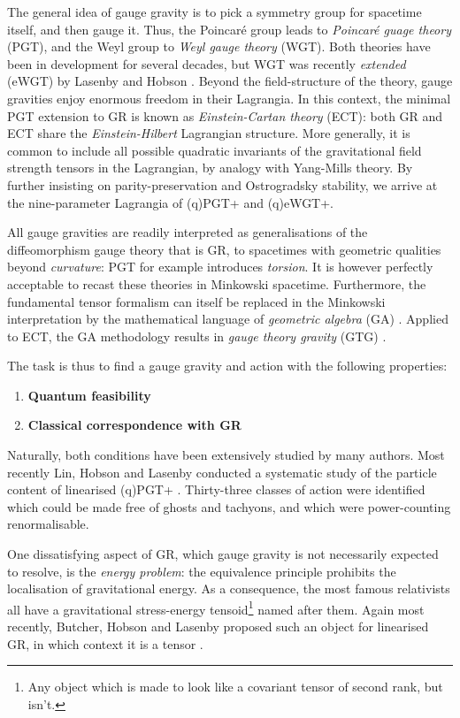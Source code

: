 \documentclass[twoside]{report}
\begin{document}
\begin{multicols}{2}
The general idea of gauge gravity is to pick a symmetry group for spacetime itself, and then gauge it. Thus, the Poincar\'e group leads to \textit{Poincar\'e guage theory} (PGT), and the Weyl group to \textit{Weyl gauge theory} (WGT). Both theories have been in development for several decades, but WGT was recently \textit{extended} (eWGT) by Lasenby and Hobson \cite{lasenby-hobson-2016}. Beyond the field-structure of the theory, gauge gravities enjoy enormous freedom in their Lagrangia. In this context, the minimal PGT extension to GR is known as \textit{Einstein-Cartan theory} (ECT): both GR and ECT share the \textit{Einstein-Hilbert} Lagrangian structure. More generally, it is common to include all possible quadratic invariants of the gravitational field strength tensors in the Lagrangian, by analogy with Yang-Mills theory. By further insisting on parity-preservation and Ostrogradsky stability, we arrive at the nine-parameter Lagrangia of (q)PGT+ and (q)eWGT+. 

All gauge gravities are readily interpreted as generalisations of the diffeomorphism gauge theory that is GR, to spacetimes with geometric qualities beyond \textit{curvature}: PGT for example introduces \textit{torsion}. It is however perfectly acceptable to recast these theories in Minkowski spacetime. Furthermore, the fundamental tensor formalism can itself be replaced in the Minkowski interpretation by the mathematical language of \textit{geometric algebra} (GA) \cite{doran-lasenby}. Applied to ECT, the GA methodology results in \textit{gauge theory gravity} (GTG) \cite{1998RSPTA.356..487L}. 

The task is thus to find a gauge gravity and action with the following properties:
\begin{enumerate}[resume]
  \item \textbf{Quantum feasibility}
  \item \textbf{Classical correspondence with GR}
\end{enumerate}

Naturally, both conditions have been extensively studied by many authors. Most recently Lin, Hobson and Lasenby conducted a systematic study of the particle content of linearised (q)PGT+ \cite{2019PhRvD..99f4001L,Lin2}. Thirty-three classes of action were identified which could be made free of ghosts and tachyons, and which were power-counting renormalisable.

One dissatisfying aspect of GR, which gauge gravity is not necessarily expected to resolve, is the \textit{energy problem}: the equivalence principle prohibits the localisation of gravitational energy. As a consequence, the most famous relativists all have a gravitational stress-energy tensoid\footnote{Any object which is made to look like a covariant tensor of second rank, but isn't.} named after them. Again most recently, Butcher, Hobson and Lasenby proposed such an object for linearised GR, in which context it is a tensor \cite{2014JPhCS.484a2011B,2012PhRvD..86h4012B,2012PhRvD..86h4013B}. 


\end{multicols}
\end{document}
